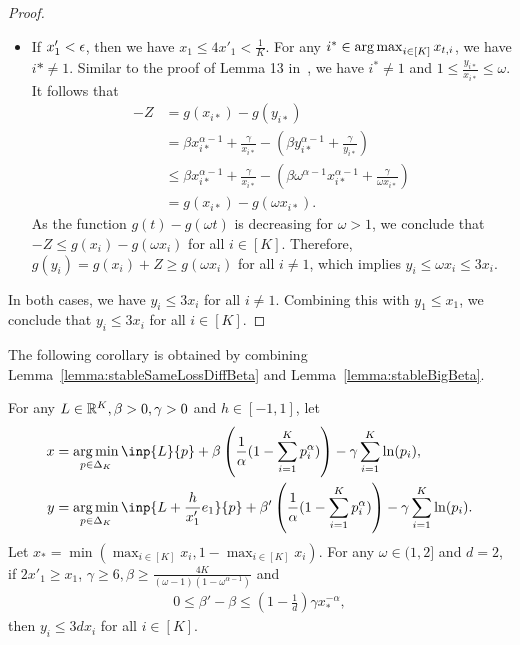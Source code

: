 \begin{proof}
\begin{itemize}
        \item If $x'_1 < {\epsilon}$, then we have $x_1 \leq 4x'_1 < \frac{1}{K}$. For any $i^* \in \operatorname*{arg\,max}_{i \in [K]}x_{t,i}$, 
        {we have $i* \neq 1$}. Similar to the proof of Lemma 13 in~\cite{ItoCOLT2024}, we have $i^* \neq 1$ and $1 \leq \frac{y_{i*}}{x_{i*}} \leq \omega$.
        It follows that 
        \begin{align*}
            -Z &= g(x_{i*}) - g(y_{i*}) \\
            &= \beta x_{i*}^{\alpha - 1} + \frac{\gamma}{x_{i*}} - (\beta y_{i*}^{\alpha - 1} + \frac{\gamma}{y_{i*}}) \\
            &\leq \beta x_{i*}^{\alpha - 1} + \frac{\gamma}{x_{i*}} - (\beta \omega^{\alpha - 1}x_{i*}^{\alpha - 1} + \frac{\gamma}{\omega x_{i*}}) \\
            &= g(x_{i*}) - g(\omega x_{i*}).
        \end{align*}
        As the function $g(t) - g(\omega t)$ is decreasing for $\omega > 1$, we conclude that $-Z \leq g(x_i) - g(\omega x_i)$ for all $i \in [K]$. Therefore, $g(y_i) = g(x_i) + Z \geq g(\omega x_i)$ for all $i \neq 1$, which implies $y_i \leq \omega x_i \leq 3x_i$.
    \end{itemize}
    In both cases, we have $y_i \leq 3x_i$ for all $i \neq 1$. Combining this with $y_1 \leq x_1$, we conclude that $y_i \leq 3x_i$ for all $i \in [K]$.
\end{proof}
The following corollary is obtained by combining Lemma~\ref{lemma:stableSameLossDiffBeta} and Lemma~\ref{lemma:stableBigBeta}.
\begin{corollary}
    For any $L \in \mathbb{R}^K, \beta > 0, \gamma > 0$ and $h \in [-1, 1]$, let 
    \begin{align*}
        x &= \argmin_{p \in \Delta_K}\inp{L}{p} + \beta\left(\frac{1}{\alpha}(1-\sum_{i=1}^K p_i^\alpha)\right) - \gamma\sum_{i=1}^K \ln(p_i), \\
        y &= \argmin_{p \in \Delta_K}\inp{L + \frac{h}{x'_1}e_1}{p} + \beta'\left(\frac{1}{\alpha}(1-\sum_{i=1}^K p_i^\alpha)\right) - \gamma\sum_{i=1}^K \ln(p_i).
    \end{align*}
    Let $x_* = \min(\max_{i \in [K]}x_i, 1 - \max_{i \in [K]}x_i)$. For any $\omega \in (1, 2]$ and $d = 2$, if $2x'_1 \geq x_1$, $\gamma \geq 6, \beta \geq \frac{4K}{(\omega-1)(1-\omega^{\alpha-1})}$ and 
    \begin{align}
        0 \leq \beta' - \beta \leq (1 - \frac{1}{d})\gamma x_*^{-\alpha},
    \end{align}     
    then $y_i \leq 3dx_i$ for all $i \in [K]$.
    \label{corollary:stable}
\end{corollary}
